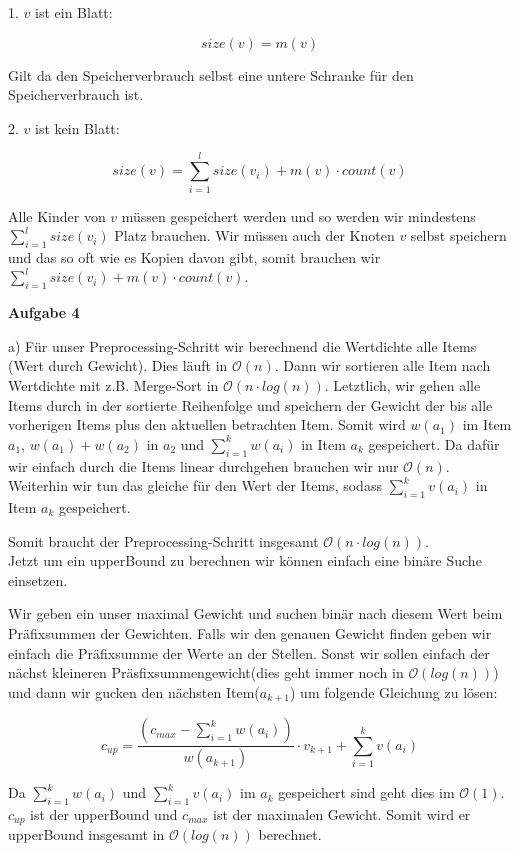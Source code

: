 \documentclass[a4paper,12pt]{scrartcl}
\begin{document}
1. $v$ ist ein Blatt:

$$size(v) = m(v)$$

Gilt da den Speicherverbrauch selbst eine untere Schranke für den Speicherverbrauch ist.

2. $v$ ist kein Blatt:

$$size(v) = \sum_{i=1}^{l} size(v_i) + m(v)\cdot count(v)$$

Alle Kinder von $v$ müssen gespeichert werden und so werden wir mindestens $\sum_{i=1}^{l} size(v_i)$ Platz brauchen. Wir müssen auch der Knoten $v$ selbst speichern und das so oft wie es Kopien davon gibt, somit brauchen wir $\sum_{i=1}^{l} size(v_i) + m(v)\cdot count(v)$.\\

\begin{large}
	\textbf{Aufgabe 4}\\
\end{large}

a) Für unser Preprocessing-Schritt wir berechnend die Wertdichte alle Items (Wert durch Gewicht). Dies läuft in $\mathcal{O}(n)$. Dann wir sortieren alle Item nach Wertdichte mit z.B. Merge-Sort in $\mathcal{O}(n \cdot log(n))$. Letztlich, wir gehen alle Items durch in der sortierte Reihenfolge und speichern der Gewicht der bis alle vorherigen Items plus den aktuellen betrachten Item. Somit wird $w(a_1)$ im Item $a_1$, $w(a_1) + w(a_2)$ in $a_2$ und $\sum_{i=1}^{k}w(a_i)$ in Item $a_k$ gespeichert. Da dafür wir einfach durch die Items linear durchgehen brauchen wir nur $\mathcal{O}(n)$. Weiterhin wir tun das gleiche für den Wert der Items, sodass $\sum_{i=1}^{k}v(a_i)$ in Item $a_k$ gespeichert.

Somit braucht der Preprocessing-Schritt insgesamt $\mathcal{O}(n \cdot log(n))$.\\

Jetzt um ein upperBound zu berechnen wir können einfach eine binäre Suche einsetzen.

Wir geben ein unser maximal Gewicht und suchen binär nach diesem Wert beim Präfixsummen der Gewichten. Falls wir den genauen Gewicht finden geben wir einfach die Präfixsumme der Werte an der Stellen. Sonst wir sollen einfach der nächst kleineren Präsfixsummengewicht(dies geht immer noch in $\mathcal{O}(log(n))$) und dann wir gucken den nächsten Item($a_{k+1}$) um folgende Gleichung zu lösen:

$$c_{up} = \frac{(c_{max} - \sum_{i=1}^{k}w(a_i))}{w(a_{k+1})} \cdot v_{k+1} + \sum_{i=1}^{k}v(a_i)$$

Da $\sum_{i=1}^{k}w(a_i)$ und $\sum_{i=1}^{k}v(a_i)$ im $a_k$ gespeichert sind geht dies im $\mathcal{O}(1)$. $c_{up}$ ist der upperBound und $c_{max}$ ist der maximalen Gewicht. Somit wird er upperBound insgesamt in $\mathcal{O}(log(n))$ berechnet.
\end{document}
